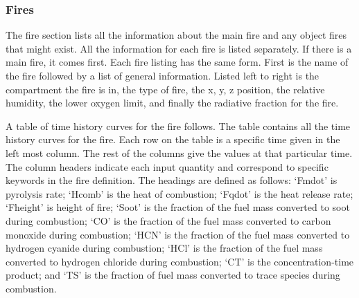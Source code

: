 \subsubsection{Fires}

The fire section lists all the information about the main fire and any object fires that might exist.  All the information for each fire is listed separately.  If there is a main fire, it comes first.  Each fire listing has the same form.  First is the name of the fire followed by a list of general information.  Listed left to right is the compartment the fire is in, the type of fire, the x, y, z position, the relative humidity, the lower oxygen limit, and finally the radiative fraction for the fire.

A table of time history curves for the fire follows.  The table contains all the time history curves for the fire.  Each row on the table is a specific time given in the left most column.  The rest of the columns give the values at that particular time.  The column headers indicate each input quantity and correspond to specific keywords in the fire definition. The headings are defined as follows: `Fmdot' is pyrolysis rate; `Hcomb' is the heat of combustion; `Fqdot' is the heat release rate; `Fheight' is height of fire; `Soot' is the fraction of the fuel mass converted to soot during combustion; `CO' is the fraction of the fuel mass converted to carbon monoxide during combustion; `HCN' is the fraction of the fuel mass converted to hydrogen cyanide during combustion; `HCl' is the fraction of the fuel mass converted to hydrogen chloride during combustion; `CT' is the concentration-time product; and `TS' is the fraction of fuel mass converted to trace species during combustion.

